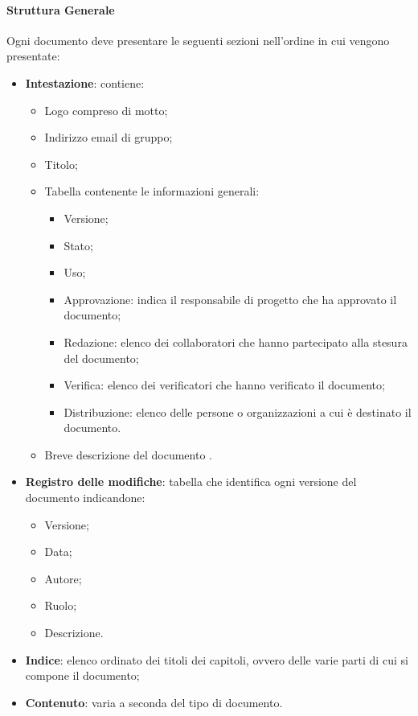 \paragraph{Struttura Generale}
Ogni documento deve presentare le seguenti sezioni nell'ordine in cui vengono presentate:
\begin{itemize} 
    \item \textbf{Intestazione}:
    contiene:
    \begin{itemize} 
        \item Logo compreso di motto;
        \item Indirizzo email di gruppo; 
        \item Titolo;
        \item Tabella contenente le informazioni generali:
        \begin{itemize}
            \item Versione;
            \item Stato;
            \item Uso;
            \item Approvazione: indica il responsabile di progetto che ha approvato il documento; 
            \item Redazione: elenco dei collaboratori che hanno partecipato alla stesura del documento;
            \item Verifica: elenco dei verificatori che hanno verificato il documento;
            \item Distribuzione: elenco delle persone o organizzazioni a cui è destinato il documento.
        \end{itemize}
        \item Breve descrizione del documento .
    \end{itemize}
    \item \textbf{Registro delle modifiche}:
    tabella che identifica ogni versione del documento indicandone:
    \begin{itemize} 
        \item Versione;
        \item Data;
        \item Autore;
        \item Ruolo;
        \item Descrizione.
    \end{itemize}
    \item \textbf{Indice}:
    elenco ordinato dei titoli dei capitoli, ovvero delle varie parti di cui si compone il documento;
    \item \textbf{Contenuto}:
    varia a seconda del tipo di documento.
\end{itemize}

